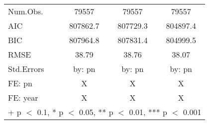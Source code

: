 \begin{table}
\begin{tabular}[t]{lccc}
\midrule
Num.Obs. & \num{79557} & \num{79557} & \num{79557}\\
AIC & \num{807862.7} & \num{807729.3} & \num{804897.4}\\
BIC & \num{807964.8} & \num{807831.4} & \num{804999.5}\\
RMSE & \num{38.79} & \num{38.76} & \num{38.07}\\
Std.Errors & by: pn & by: pn & by: pn\\
FE: pn & X & X & X\\
FE: year & X & X & X\\
\bottomrule
\multicolumn{4}{l}{\rule{0pt}{1em}+ p $<$ 0.1, * p $<$ 0.05, ** p $<$ 0.01, *** p $<$ 0.001}\\
\end{tabular}
\end{table}
